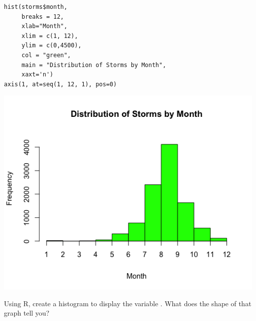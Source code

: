 \begin{multicols}{2}

\begin{lstlisting}
hist(storms$month, 
     breaks = 12, 
     xlab="Month",
     xlim = c(1, 12), 
     ylim = c(0,4500), 
     col = "green",
     main = "Distribution of Storms by Month",
     xaxt='n')
axis(1, at=seq(1, 12, 1), pos=0)
\end{lstlisting}

\columnbreak

\includegraphics[width=0.3\tw]{02/fig-month-hist.png}

\end{multicols}


\ii Using R, create a histogram to display the variable \textbf{}. What does the shape of that graph tell you? 

